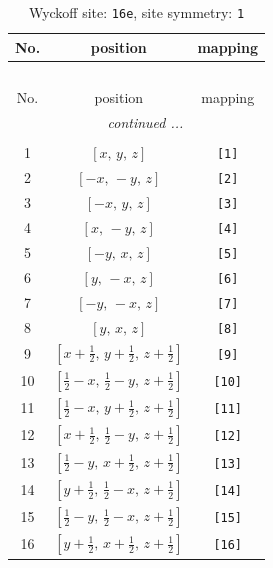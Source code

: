 \documentclass[fleqn,8pt]{jsarticle}
\begin{document}
\begin{longtable}{ccc}
\caption{Wyckoff site: {\tt 16e}, site symmetry: {\tt 1}}
 \\
 \hline \hline
No. & position & mapping \\ \hline \endfirsthead

\multicolumn{2}{l}{\tablename\ \thetable{}} \\
 \hline \hline
No. & position & mapping \\ \hline \endhead

 \hline \hline
\multicolumn{2}{r}{\footnotesize\it continued ...} \\ \endfoot

 \hline \hline
\multicolumn{2}{r}{} \\ \endlastfoot

1 & $\left[ x,\, y,\, z \right]$ & {\tt [1]} \\ \hline
2 & $\left[ - x,\, - y,\, z \right]$ & {\tt [2]} \\ \hline
3 & $\left[ - x,\, y,\, z \right]$ & {\tt [3]} \\ \hline
4 & $\left[ x,\, - y,\, z \right]$ & {\tt [4]} \\ \hline
5 & $\left[ - y,\, x,\, z \right]$ & {\tt [5]} \\ \hline
6 & $\left[ y,\, - x,\, z \right]$ & {\tt [6]} \\ \hline
7 & $\left[ - y,\, - x,\, z \right]$ & {\tt [7]} \\ \hline
8 & $\left[ y,\, x,\, z \right]$ & {\tt [8]} \\ \hline
9 & $\left[ x + \frac{1}{2},\, y + \frac{1}{2},\, z + \frac{1}{2} \right]$ & {\tt [9]} \\ \hline
10 & $\left[ \frac{1}{2} - x,\, \frac{1}{2} - y,\, z + \frac{1}{2} \right]$ & {\tt [10]} \\ \hline
11 & $\left[ \frac{1}{2} - x,\, y + \frac{1}{2},\, z + \frac{1}{2} \right]$ & {\tt [11]} \\ \hline
12 & $\left[ x + \frac{1}{2},\, \frac{1}{2} - y,\, z + \frac{1}{2} \right]$ & {\tt [12]} \\ \hline
13 & $\left[ \frac{1}{2} - y,\, x + \frac{1}{2},\, z + \frac{1}{2} \right]$ & {\tt [13]} \\ \hline
14 & $\left[ y + \frac{1}{2},\, \frac{1}{2} - x,\, z + \frac{1}{2} \right]$ & {\tt [14]} \\ \hline
15 & $\left[ \frac{1}{2} - y,\, \frac{1}{2} - x,\, z + \frac{1}{2} \right]$ & {\tt [15]} \\ \hline
16 & $\left[ y + \frac{1}{2},\, x + \frac{1}{2},\, z + \frac{1}{2} \right]$ & {\tt [16]} \\
\end{longtable}
\end{document}

